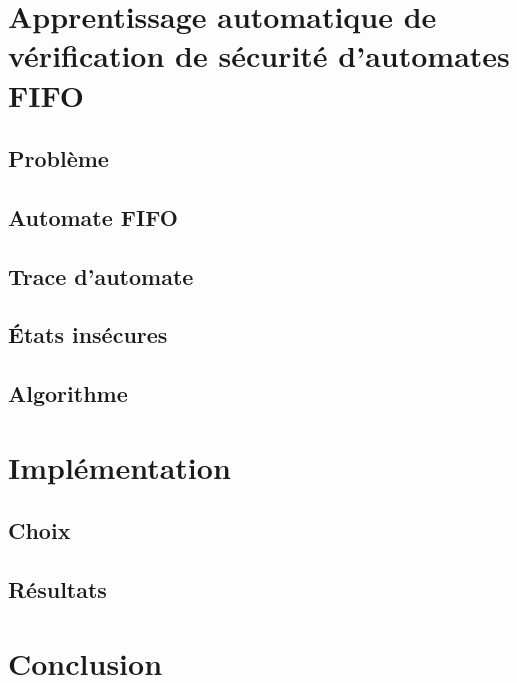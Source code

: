 	\chapter{Apprentissage automatique de vérification de sécurité d'automates FIFO}\label{ch:learning}
	\section{Problème}\label{sec:prob}%
	\section{Automate FIFO}\label{sec:fifo}
	\section{Trace d'automate}\label{sec:trace}%
	\section{États insécures}\label{sec:unsafe}%
	\section{Algorithme}\label{sec:algo}%

	\chapter{Implémentation}\label{ch:impl}
	\section{Choix}\label{sec:choix}
	\section{Résultats}\label{sec:res}

	\chapter{Conclusion}\label{ch:ccl}


	\newpage
	
	


